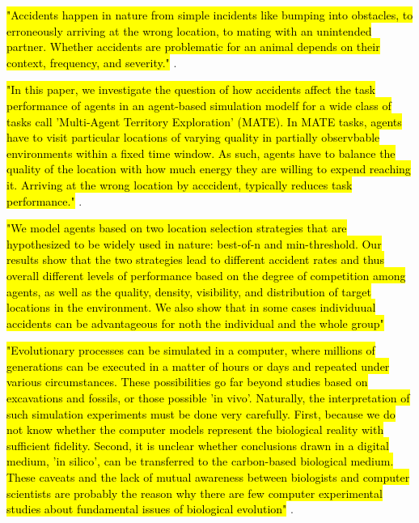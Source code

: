 \hl{"Accidents happen in nature from simple incidents like bumping into obstacles, to erroneously arriving at the wrong location, to mating with an unintended partner. Whether accidents are problematic for an animal depends on their context, frequency, and severity."} \cite{ferreira2018accidental}.

\hl{"In this paper, we investigate the question of how accidents affect the task performance of agents in an agent-based simulation modelf for a wide class of tasks call 'Multi-Agent Territory Exploration' (MATE). In MATE tasks, agents have to visit particular locations of varying quality in partially observbable environments within a fixed time window. As such, agents have to balance the quality of the location with how much energy they are willing to expend reaching it. Arriving at the wrong location by acccident, typically reduces task performance."} \cite{ferreira2018accidental}.

\hl{"We model agents based on two location selection strategies that are hypothesized to be widely used in nature: best-of-n and min-threshold. Our results show that the two strategies lead to different accident rates and thus overall different levels of performance based on the degree of competition among agents, as well as the quality, density, visibility, and distribution of target locations in the environment. We also show that in some cases individuual accidents can  be advantageous for noth the individual and the whole group"} \cite{ferreira2018accidental}



\hl{"Evolutionary processes can be simulated in a computer, where millions of generations can be executed in a matter of hours or days and repeated under various circumstances. These possibilities go far beyond studies based on excavations and fossils, or those possible 'in vivo'. Naturally, the interpretation of such simulation experiments must be done very carefully. First, because we do not know whether the computer models represent the biological reality with sufficient fidelity. Second, it is unclear whether conclusions drawn in a digital medium, 'in silico', can be transferred to the carbon-based biological medium. These caveats and the lack of mutual awareness between biologists and computer scientists are probably the reason why there are few computer experimental studies about fundamental issues of biological evolution"} \cite{EibenSmith2003}.



